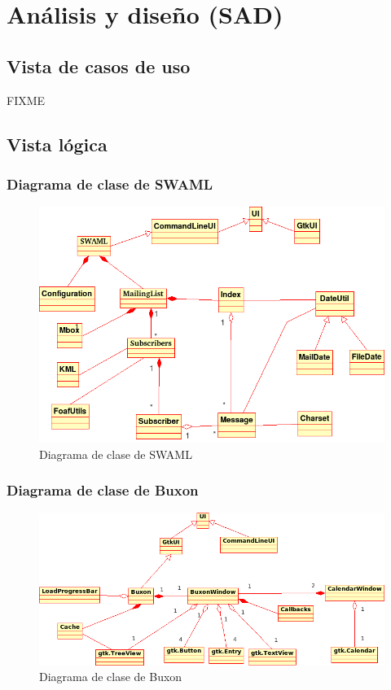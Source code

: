 
\section{Análisis y diseño (SAD)}

\subsection{Vista de casos de uso}

FIXME

\subsection{Vista lógica}

\subsubsection{Diagrama de clase de SWAML}

\begin{figure}[p]
	\centering
 	\includegraphics[width=14cm]{images/uml/clases/swaml.png}
	\caption{Diagrama de clase de SWAML}
	\label{fig:uml:swaml}
\end{figure}

\subsubsection{Diagrama de clase de Buxon}

\begin{figure}[p]
	\centering
 	\includegraphics[width=15cm]{images/uml/clases/buxon.png}
	\caption{Diagrama de clase de Buxon}
	\label{fig:uml:buxon}
\end{figure}


